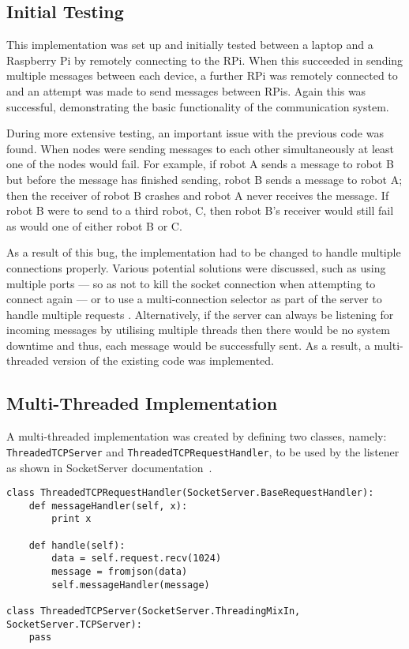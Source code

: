\subsection{Initial Testing}\label{soft/comms/initest}
This implementation was set up and initially tested between a laptop and a
Raspberry Pi by remotely connecting to the RPi. When this succeeded in sending
multiple messages between each device, a further RPi was remotely connected to and
an attempt was made to send messages between RPis. Again this was successful,
demonstrating the basic functionality of the communication system.

During more extensive testing, an important issue with the previous
code was found. When nodes were sending messages to each other simultaneously
at least one of the nodes would fail. For example, if robot A sends a message to
robot B but before the message has finished sending, robot B sends a message to
robot A; then the receiver of robot B crashes and robot A never receives the message.
If robot B were to send to a third robot, C, then robot B's receiver would still
fail as would one of either robot B or C.

As a result of this bug, the implementation had to be changed to handle
multiple connections properly. Various potential solutions were discussed,
such as using multiple ports --- so as not to kill the socket connection when
attempting to connect again --- or to use a multi-connection selector as part of
the server to handle multiple requests \cite{multiconnectionServer}.
Alternatively, if the server can always be listening for incoming messages by
utilising multiple threads then there would be no system downtime and
thus, each message would be successfully sent. As a result, a multi-threaded version
of the existing code was implemented.


\subsection{Multi-Threaded Implementation}\label{soft/comms/mtimpl}

A multi-threaded implementation was created by defining two classes, namely: \verb|ThreadedTCPServer| and
\verb|ThreadedTCPRequestHandler|, to be used by the listener as shown in
SocketServer documentation~\cite{socketServerDocs}.

\begin{lstlisting}[caption={ThreadedTCPRequestHandler}, label={lst:comms_tcprequest}]
class ThreadedTCPRequestHandler(SocketServer.BaseRequestHandler):
    def messageHandler(self, x):
        print x

    def handle(self):
        data = self.request.recv(1024)
        message = fromjson(data)
        self.messageHandler(message)

class ThreadedTCPServer(SocketServer.ThreadingMixIn, SocketServer.TCPServer):
    pass
\end{lstlisting}

